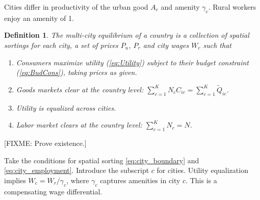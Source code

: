 \documentclass[12pt]{article}
\newtheorem{definition}{Definition}
\begin{document}
Cities differ in productivity of the urban good $A_c$ and amenity $\gamma_c$. Rural workers enjoy an amenity of 1.

\begin{definition}
The multi-city equilibrium of a country is a collection of spatial sortings for each city, a set of prices $P_{u}$, $P_r$ and city wages $W_c$ such that
\begin{enumerate}
    \item Consumers maximize utility (\ref{eq:Utility}) subject to their budget constraint (\ref{eq:BudCons}), taking prices as given.
    \item Goods markets clear at the country level: $\sum_{c=1}^K N_c C_{ic}=\sum_{c=1}^K\tilde Q_{ic}$.
	\item Utility is equalized across cities. 
	\item Labor market clears at the country level: $\sum_{c=1}^K N_c = N$.
\end{enumerate}
\end{definition}

[FIXME: Prove existence.]

Take the conditions for spatial sorting \eqref{eq:city_boundary} and \eqref{eq:city_employment}. 
Introduce the subscript $c$ for cities. Utility equalization implies $W_c = W_r/\gamma_c$, where $\gamma_c$ captures amenities in city $c$. This is a compensating wage differential.
\end{document}
